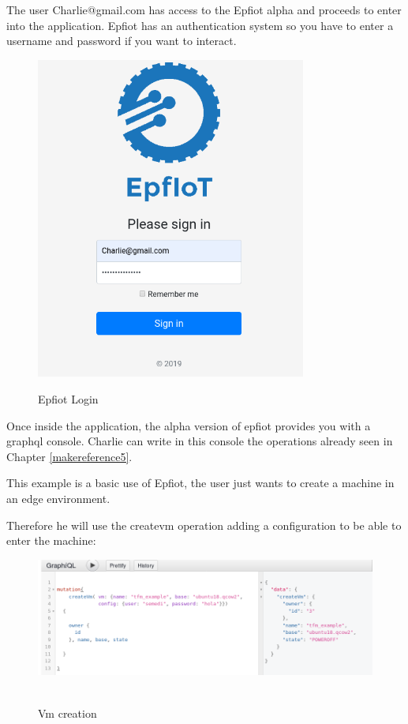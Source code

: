 The user Charlie@gmail.com has access to the Epfiot alpha and proceeds to enter into the application. Epfiot has an authentication system so you have to enter a username and password if you want to interact.
\begin{figure}[h!]%
\centering
    \includegraphics[width=3.5in]{figures/login.png}
~\caption{Epfiot Login}
\label{figure6.2}
\end{figure}

Once inside the application, the alpha version of epfiot provides you with a graphql console.
Charlie can write in this console the operations already seen in Chapter \ref{makereference5}.

This example is a basic use of Epfiot, the user just wants to create a machine in an edge environment.

\newpage
Therefore he will use the createvm operation adding a configuration to be able to enter the machine:

\begin{figure}[h!]%
\centering
    \includegraphics[width=6.5in]{figures/create_vm.png}
~\caption{Vm creation}
\label{figure6.3}
\end{figure}

